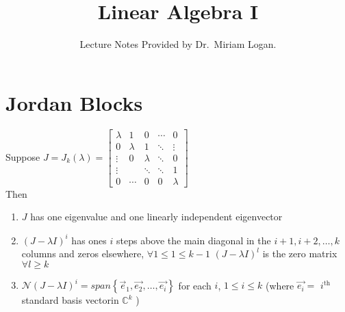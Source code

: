 \documentclass{report}
\begin{document}
\title{Linear Algebra I}
\author{Lecture Notes Provided by Dr.~Miriam Logan.}
\date{}
\maketitle
\tableofcontents
\newpage  
\section{Jordan Blocks}
\thm{}
{
Suppose $ J = J _k \left( \lambda \right) = \begin{bmatrix}
  \lambda & 1       & 0       & \cdots & 0 \\[2pt]
  0       & \lambda & 1       & \ddots & \vdots \\[2pt]
  \vdots  & 0       & \lambda & \ddots & 0 \\[2pt]
  \vdots  &         & \ddots  & \ddots & 1 \\[2pt]
  0       & \cdots  & 0       & 0      & \lambda
\end{bmatrix}$ \\
Then 
\begin{enumerate}[label=(\arabic*).]  
\item $ J$ has one eigenvalue and one linearly independent eigenvector
\item  $ \left( J - \lambda I \right) ^{ i}$ has ones $ i$ steps above the main diagonal in the $ i+1 ,i+2,\ldots, k$  columns and zeros elsewhere, $ \forall 1 \leq 1 \leq k-1$ $ \left( J - \lambda I \right) ^{l} $ is the zero matrix $ \forall  l \ge k$ 
\item $ \mathcal{N} \left( J - \lambda I \right) ^{i} = span \left\{ \vec{ e}_1, \vec{ e_2} , \ldots , \vec{ e_i}  \right\} $ 
	for each $ i $, $ 1 \leq i \leq k$ (where $ \vec{ e_i} =$ $i^{\text{th}}$ standard basis vectorin $ \mathbb{C} ^{k}$ )
\end{enumerate}


}
\end{document}
